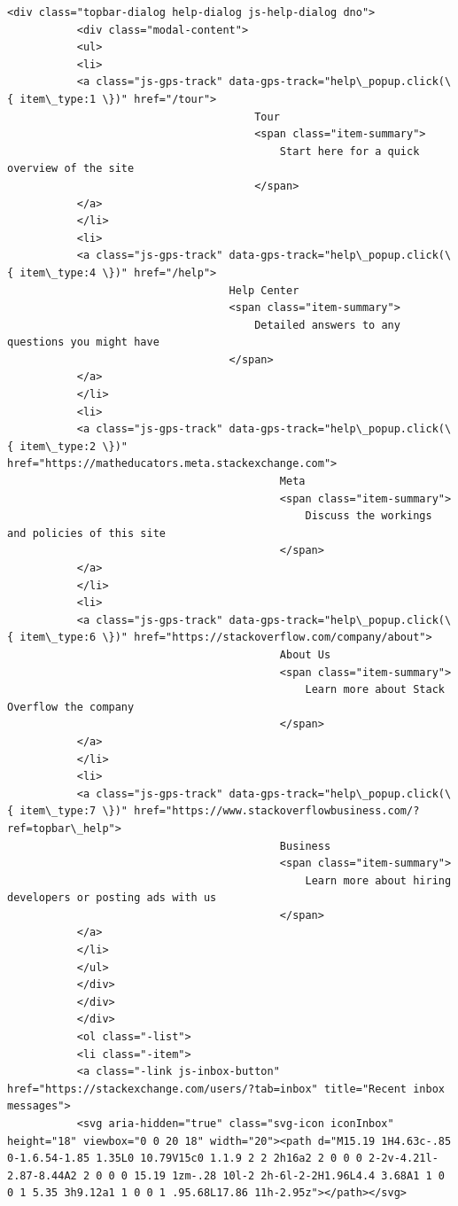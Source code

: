 \documentclass[11pt]{article}
\begin{document}
\begin{Verbatim}[commandchars=\\\{\}]
           <div class="topbar-dialog help-dialog js-help-dialog dno">
           <div class="modal-content">
           <ul>
           <li>
           <a class="js-gps-track" data-gps-track="help\_popup.click(\{ item\_type:1 \})" href="/tour">
                                       Tour
                                       <span class="item-summary">
                                           Start here for a quick overview of the site
                                       </span>
           </a>
           </li>
           <li>
           <a class="js-gps-track" data-gps-track="help\_popup.click(\{ item\_type:4 \})" href="/help">
                                   Help Center
                                   <span class="item-summary">
                                       Detailed answers to any questions you might have
                                   </span>
           </a>
           </li>
           <li>
           <a class="js-gps-track" data-gps-track="help\_popup.click(\{ item\_type:2 \})" href="https://matheducators.meta.stackexchange.com">
                                           Meta
                                           <span class="item-summary">
                                               Discuss the workings and policies of this site
                                           </span>
           </a>
           </li>
           <li>
           <a class="js-gps-track" data-gps-track="help\_popup.click(\{ item\_type:6 \})" href="https://stackoverflow.com/company/about">
                                           About Us
                                           <span class="item-summary">
                                               Learn more about Stack Overflow the company
                                           </span>
           </a>
           </li>
           <li>
           <a class="js-gps-track" data-gps-track="help\_popup.click(\{ item\_type:7 \})" href="https://www.stackoverflowbusiness.com/?ref=topbar\_help">
                                           Business
                                           <span class="item-summary">
                                               Learn more about hiring developers or posting ads with us
                                           </span>
           </a>
           </li>
           </ul>
           </div>
           </div>
           </div>
           <ol class="-list">
           <li class="-item">
           <a class="-link js-inbox-button" href="https://stackexchange.com/users/?tab=inbox" title="Recent inbox messages">
           <svg aria-hidden="true" class="svg-icon iconInbox" height="18" viewbox="0 0 20 18" width="20"><path d="M15.19 1H4.63c-.85 0-1.6.54-1.85 1.35L0 10.79V15c0 1.1.9 2 2 2h16a2 2 0 0 0 2-2v-4.21l-2.87-8.44A2 2 0 0 0 15.19 1zm-.28 10l-2 2h-6l-2-2H1.96L4.4 3.68A1 1 0 0 1 5.35 3h9.12a1 1 0 0 1 .95.68L17.86 11h-2.95z"></path></svg>

\end{Verbatim}
\end{document}
